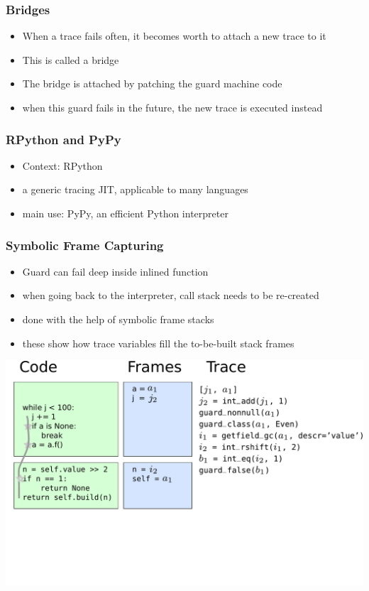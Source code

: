 \documentclass[utf8x]{beamer}
\begin{document}

\begin{frame}
  \frametitle{Bridges}
  \begin{itemize}
      \item When a trace fails often, it becomes worth to attach a new trace to it
          \item This is called a bridge
          \item The bridge is attached by patching the guard machine code
          \item when this guard fails in the future, the new trace is executed instead
  \end{itemize}
\end{frame}

\begin{frame}
  \frametitle{RPython and PyPy}
  \begin{itemize}
      \item Context: RPython
      \item a generic tracing JIT, applicable to many languages
      \item main use: PyPy, an efficient Python interpreter
  \end{itemize}
\end{frame}


\begin{frame}
  \frametitle{Symbolic Frame Capturing}
  \begin{itemize}
      \item Guard can fail deep inside inlined function
      \item when going back to the interpreter, call stack needs to be re-created
      \item done with the help of symbolic frame stacks
      \item these show how trace variables fill the to-be-built stack frames
  \end{itemize}
\end{frame}

\begin{frame}
  \includegraphics[scale=0.4]{figures/loop07}
\end{frame}
\end{document}
